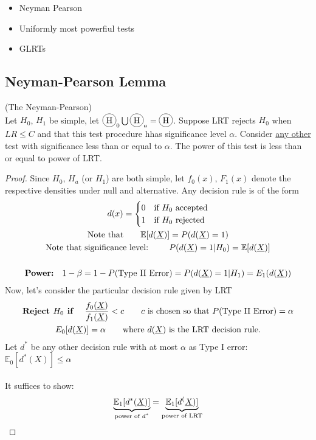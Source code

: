 \begin{itemize}
	\item Neyman Pearson
	\item Uniformly most powerfiul tests
	\item GLRTs
\end{itemize}
\subsection*{Neyman-Pearson Lemma}
\begin{theorem} (The Neyman-Pearson)\\
Let $H_0$, $H_1$ be simple, let $\circled{H}_0 \bigcup \circled{H}_a = \circled{H}$. Suppose LRT rejects $H_0$ when $LR \leq C$ and that this test procedure hhas significance level $\alpha$. Consider \underline{any other} test with significance less than or equal to $\alpha$. The power of this test is less than or equal to power of LRT.
\end{theorem}
\begin{proof}
	Since $H_0$, $H_a$ (or $H_1$) are both simple, let $f_0(x)$, $F_1(x)$ denote the respective densities under null and alternative. 	Any decision rule is of the form 
	\begin{gather*}
		d(x) = \begin{cases}
		0 & \text{if $H_0$ accepted}\\
		1 & \text{if $H_0$ rejected}
		\end{cases}\\
		\text{Note that} \qquad \mathbb{E}[d(\underline{X})] = P(d(\underline{X}) = 1)\\
		\text{Note that significance level: } \qquad P(d(\underline{X}) = 1 | H_0) = \mathbb{E}[d(\underline{X})]\\\\
		\textbf{Power:} \quad 1 - \beta = 1 - P(\text{Type II Error}) = P(d(\underline{X}) = 1 | H_1) = E_1 (d(\underline{X}))
	\end{gather*}
	Now, let's consider the particular decision rule given by LRT
	\begin{gather*}
		\textbf{Reject $H_0$ if }\quad \frac{f_0(\underline{X})}{f_1(\underline{X})} < c \qquad c \text{ is chosen so that } P(\text{Type II Error}) = \alpha\\
		E_0[d(\underline{X})] = \alpha \qquad \text{where $d(\underline{X})$ is the LRT decision rule}.
	\end{gather*}
	Let $d^*$ be any other decision rule with at most $\alpha$ as Type I error: $\mathbb{E}_0 [d^*(X)] \leq \alpha$\\\\
	It suffices to show:
	\begin{equation*}
		\underbrace{\mathbb{E}_1 [d^*(\underline{X})]}_{\text{power of $d^*$}} = \underbrace{\mathbb{E}_1 [d^(\underline{X})]}_{\text{power of LRT}}
	\end{equation*} 
\end{proof}
